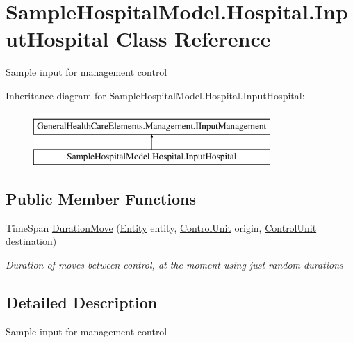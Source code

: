\hypertarget{class_sample_hospital_model_1_1_hospital_1_1_input_hospital}{}\section{Sample\+Hospital\+Model.\+Hospital.\+Input\+Hospital Class Reference}
\label{class_sample_hospital_model_1_1_hospital_1_1_input_hospital}


Sample input for management control  


Inheritance diagram for Sample\+Hospital\+Model.\+Hospital.\+Input\+Hospital\+:\begin{figure}[H]
\begin{center}
\leavevmode
\includegraphics[height=2.000000cm]{class_sample_hospital_model_1_1_hospital_1_1_input_hospital}
\end{center}
\end{figure}
\subsection*{Public Member Functions}
\begin{DoxyCompactItemize}
\item 
Time\+Span \hyperlink{class_sample_hospital_model_1_1_hospital_1_1_input_hospital_ac2c3af5e53c28a4187da70dd0b92adc1}{Duration\+Move} (\hyperlink{class_simulation_core_1_1_h_c_c_m_elements_1_1_entity}{Entity} entity, \hyperlink{class_simulation_core_1_1_h_c_c_m_elements_1_1_control_unit}{Control\+Unit} origin, \hyperlink{class_simulation_core_1_1_h_c_c_m_elements_1_1_control_unit}{Control\+Unit} destination)
\begin{DoxyCompactList}\small\item\em Duration of moves between control, at the moment using just random durations \end{DoxyCompactList}\end{DoxyCompactItemize}


\subsection{Detailed Description}
Sample input for management control 



